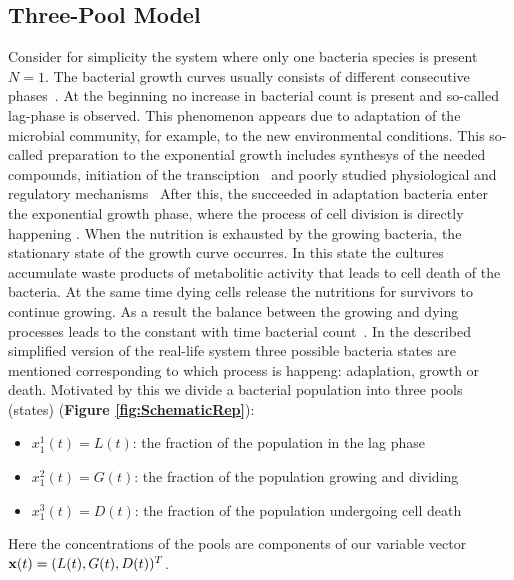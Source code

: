 \documentclass[10pt,A4paper]{article}
\begin{document}
\subsection{Three-Pool Model}
Consider for simplicity the system where only one bacteria species is present $N=1$.
The bacterial growth curves usually consists of different consecutive phases~\cite{buchanan_when_1997}.
At the beginning no increase in bacterial count is present and so-called lag-phase is observed.
This phenomenon appears due to adaptation of the microbial community, for example, to the new environmental conditions.
This so-called preparation to the exponential growth includes synthesys of the needed compounds, initiation of the transciption~\cite{rolfe_lag_2012} and poorly studied physiological and regulatory mechanisms~\cite{monod_growth_1949}
After this, the succeeded in adaptation bacteria enter the exponential growth phase, where the process of cell division is directly happening .
When the nutrition is exhausted by the growing bacteria, the stationary state of the growth curve occurres.
In this state the cultures accumulate waste products of metabolitic activity that leads to cell death of the bacteria.
At the same time dying cells release the nutritions for survivors to continue growing.
As a result the balance between the growing and dying processes leads to the constant with time bacterial count~\cite{navarro_llorens_stationary_2010}.
In the described simplified version of the real-life system three possible bacteria states are mentioned corresponding to which process is happeng: adaplation, growth or death.
Motivated by this we divide a bacterial population into three pools (states) (\textbf{Figure \ref{fig:SchematicRep}}): 
\begin{itemize}
\item $x^1_1 (t) = L(t)$: the fraction of the population in the lag phase
\item $x^2_1 (t) = G(t)$: the fraction of the population growing and dividing
\item $x^3_1 (t) = D(t)$: the fraction of the population undergoing cell death
\end{itemize}
Here the concentrations of the pools are components of our variable vector $\mathbf{x} (t) = (L(t), G(t), D(t))^T$.
\end{document}

